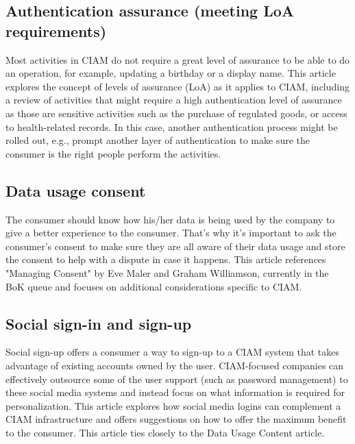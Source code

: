 \hypertarget{authentication-assurance-meeting-loa-requirements}{%
\subsection{Authentication assurance (meeting LoA
requirements)}\label{authentication-assurance-meeting-loa-requirements}}

Most activities in CIAM do not require a great level of assurance to be
able to do an operation, for example, updating a birthday or a display
name. This article explores the concept of levels of assurance (LoA) as
it applies to CIAM, including a review of activities that might require
a high authentication level of assurance as those are sensitive
activities such as the purchase of regulated goods, or access to
health-related records. In this case, another authentication process
might be rolled out, e.g., prompt another layer of authentication to
make sure the consumer is the right people perform the activities.~

\hypertarget{data-usage-consent}{%
\subsection{Data usage consent}\label{data-usage-consent}}

The consumer should know how his/her data is being used by the company
to give a better experience to the consumer. That's why it's important
to ask the consumer's consent to make sure they are all aware of their
data usage and store the consent to help with a dispute in case it
happens. This article references "Managing Consent" by Eve Maler and
Graham Williamson, currently in the BoK queue and focuses on additional
considerations specific to CIAM.

\hypertarget{social-sign-in-and-sign-up}{%
\subsection{Social sign-in and
sign-up}\label{social-sign-in-and-sign-up}}

Social sign-up offers a consumer a way to sign-up to a CIAM system that
takes advantage of existing accounts owned by the user. CIAM-focused
companies can effectively outsource some of the user support (such as
password management) to these social media systems and instead focus on
what information is required for personalization. This article explores
how social media logins can complement a CIAM infrastructure and offers
suggestions on how to offer the maximum benefit to the consumer. This
article ties closely to the Data Usage Content article.

